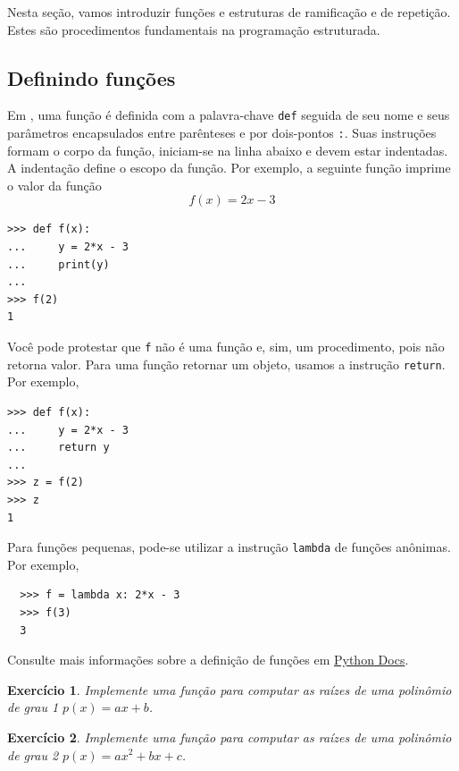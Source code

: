 \documentclass[12pt]{article}
\newtheorem{exr}{Exercício}[section]
\begin{document}
Nesta seção, vamos introduzir funções e estruturas de ramificação e de repetição. Estes são procedimentos fundamentais na programação estruturada.

\subsection{Definindo funções}

Em {\python}, uma função é definida com a palavra-chave \lstinline+def+ seguida de seu nome e seus parâmetros encapsulados entre parênteses e por dois-pontos \lstinline+:+. Suas instruções formam o corpo da função, iniciam-se na linha abaixo e devem estar indentadas. A indentação define o escopo da função. Por exemplo, a seguinte função imprime o valor da função
\begin{equation}
  f(x) = 2x - 3
\end{equation}
\begin{lstlisting}
>>> def f(x):
...     y = 2*x - 3
...     print(y)
... 
>>> f(2)
1
\end{lstlisting}
Você pode protestar que \lstinline+f+ não é uma função e, sim, um procedimento, pois não retorna valor. Para uma função retornar um objeto, usamos a instrução \lstinline+return+. Por exemplo,
\begin{lstlisting}
>>> def f(x):
...     y = 2*x - 3
...     return y
... 
>>> z = f(2)
>>> z
1
\end{lstlisting}

\begin{obs}
  Para funções pequenas, pode-se utilizar a instrução \lstinline+lambda+ de funções anônimas. Por exemplo,
  \begin{lstlisting}
  >>> f = lambda x: 2*x - 3
  >>> f(3)
  3
  \end{lstlisting}
\end{obs}

\begin{obs}
  Consulte mais informações sobre a definição de funções em \href{https://docs.python.org/3/tutorial/controlflow.html#defining-functions}{Python Docs}.
\end{obs}

\begin{exr}
  Implemente uma função para computar as raízes de uma polinômio de grau 1 $p(x) = ax + b$.
\end{exr}

\begin{exr}
  Implemente uma função para computar as raízes de uma polinômio de grau 2 $p(x) = ax^2 + bx + c$.
\end{exr}
\end{document}
